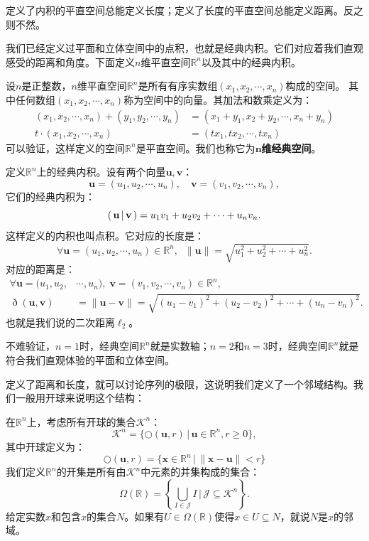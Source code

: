 \documentclass[12pt,UTF8]{ctexbook}
\begin{document}
\begin{appendix}
定义了内积的平直空间总能定义长度；定义了长度的平直空间总能定义距离。反之则不然。

我们已经定义过平面和立体空间中的点积，也就是经典内积。它们对应着我们直观感受的距离和角度。下面定义$n$维平直空间$\mathbb{R}^n$以及其中的经典内积。
\begin{df}
    设$n$是正整数，$n$维平直空间$\mathbb{R}^n$是所有有序实数组$(x_1, x_2, \cdots, x_n)$构成的空间。
    其中任何数组$(x_1, x_2, \cdots, x_n)$称为空间中的向量。其加法和数乘定义为：
    \begin{align*}
        (x_1, x_2, \cdots, x_n) + (y_1, y_2, \cdots, y_n) &= (x_1 + y_1, x_2 + y_2, \cdots, x_n + y_n) \\
        t\cdot (x_1, x_2, \cdots, x_n) &= (tx_1, tx_2, \cdots, t x_n)
    \end{align*}
    可以验证，这样定义的空间$\mathbb{R}^n$是平直空间。我们也称它为$\boldsymbol{n}$\textbf{维经典空间}。

    定义$\mathbb{R}^n$上的经典内积。设有两个向量$\mathbf{u}, \mathbf{v}$：
    $$ \mathbf{u} = (u_1, u_2, \cdots, u_n), \quad  \mathbf{v} = (v_1, v_2, \cdots, v_n), $$
    它们的经典内积为：
    $$ \displaystyle\left( \,\mathbf{u} \,\middle\vert \,\mathbf{v} \,\right) = u_1v_1 + u_2v_2 + \cdots + u_n v_n.$$
    这样定义的内积也叫点积。它对应的长度是：
    $$ \forall \mathbf{u} = (u_1, u_2, \cdots, u_n) \in \mathbb{R}^n, \;\; \| \mathbf{u}\| = \sqrt{u_1^2 + u_2^2 + \cdots + u_n^2} .$$
    对应的距离是：
    \begin{align*}
        \forall \mathbf{u} = (u_1, u_2, &\cdots, u_n), \; \mathbf{v} = (v_1, v_2, \cdots, v_n) \in \mathbb{R}^n, \\
        \eth(\mathbf{u}, \mathbf{v}) &= \| \mathbf{u} - \mathbf{v}\| = \sqrt{(u_1 - v_1)^2 + (u_2 - v_2)^2 + \cdots + (u_n - v_n)^2} .
    \end{align*}
    也就是我们说的二次距离$\ell_2$。
\end{df}
不难验证，$n=1$时，经典空间$\mathbb{R}^n$就是实数轴；$n=2$和$n=3$时，经典空间$\mathbb{R}^n$就是符合我们直观体验的平面和立体空间。

定义了距离和长度，就可以讨论序列的极限，这说明我们定义了一个邻域结构。我们一般用开球来说明这个结构：
\begin{df}
    在$\mathbb{R}^n$上，考虑所有开球的集合$\mathcal{K}^n$：
    $$ \mathcal{K}^n = \{ \bigcirc(\mathbf{u}, r) \, | \, \mathbf{u} \in \mathbb{R}^n, r \geqslant 0 \},$$
    其中开球定义为：
    $$ \bigcirc(\mathbf{u},r) = \{ \mathbf{x}\in \mathbb{R}^n\,|\, \| \mathbf{x} - \mathbf{u}\| < r\} $$
    我们定义$\mathbb{R}^n$的开集是所有由$\mathcal{K}^n$中元素的并集构成的集合：
    $$ \Omega(\mathbb{R}) = \left\{\bigcup_{I \in \mathcal{J}} I \, \Bigg| \,\mathcal{J} \subseteq  \mathcal{K}^n \right\}.$$
    给定实数$x$和包含$x$的集合$N$。如果有$U\in\Omega(\mathbb{R})$使得$x\in U\subseteq N$，就说$N$是$x$的邻域。


\end{df}
\end{appendix}
\end{document}
